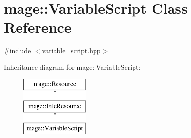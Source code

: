 \hypertarget{classmage_1_1_variable_script}{}\section{mage\+:\+:Variable\+Script Class Reference}
\label{classmage_1_1_variable_script}


{\ttfamily \#include $<$variable\+\_\+script.\+hpp$>$}

Inheritance diagram for mage\+:\+:Variable\+Script\+:\begin{figure}[H]
\begin{center}
\leavevmode
\includegraphics[height=3.000000cm]{classmage_1_1_variable_script}
\end{center}
\end{figure}

